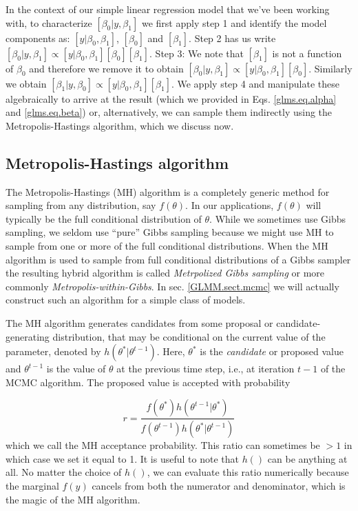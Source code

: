 In the context of our simple linear regression model that we've been 
working with, to characterize $[\beta_0|y,\beta_1]$ we first apply step 1
and identify the model components as: $[y|\beta_0, \beta_1]$, $[\beta_0]$
and $[\beta_1]$. Step 2 has us write $[\beta_0|y,\beta_1] \propto
[y|\beta_0,\beta_1][\beta_0][\beta_1]$.  Step 3: We note that $[\beta_1]$ is not a
function of $\beta_0$ and therefore we remove it to obtain $[\beta_0|y,\beta_1]
\propto [y|\beta_0,\beta_1][\beta_0]$. Similarly we obtain $[\beta_1|y,\beta_0]
\propto [y|\beta_0,\beta_1][\beta_1]$. We apply step 4 and manipulate
these algebraically to arrive at the result (which we provided in
Eqs. \ref{glms.eq.alpha} and \ref{glms.eq.beta}) or, alternatively, we can
sample them indirectly using the Metropolis-Hastings algorithm, which we 
discuss now.


\subsection{Metropolis-Hastings algorithm}

The Metropolis-Hastings (MH) algorithm is a completely generic method for
sampling from any distribution, say $f(\theta)$. In our applications,
$f(\theta)$ will typically be the full conditional distribution of
$\theta$.
While we sometimes use Gibbs sampling, we seldom
use ``pure'' Gibbs sampling because we might use MH to sample from one
or more of the full conditional distributions.
When the MH algorithm is used to sample from  full
conditional distributions of a Gibbs sampler the resulting hybrid algorithm is
called
 {\it Metrpolized Gibbs sampling} or
more commonly {\it Metropolis-within-Gibbs}.
In sec. \ref{GLMM.sect.mcmc} we will
actually construct such an algorithm for a simple class of models.

The MH algorithm generates candidates from some
proposal or candidate-generating distribution, that may be conditional
on the current value of the parameter, denoted by
$h(\theta^{*}|\theta^{t-1})$. Here, $\theta^{*}$ is the {\it candidate}
or proposed
value and $\theta^{t-1}$ is the value of $\theta$ at the previous time step, i.e., at iteration $t-1$ of
the MCMC algorithm.  The proposed value
is accepted with probability

\[
r = \frac{ f(\theta^{*}) h(\theta^{t-1}|\theta^{*})}
    {f(\theta^{t-1}) h(\theta^{*}|\theta^{t-1}) }
\]
which we call the MH acceptance probability.
This ratio can sometimes be $>1$ in which case we set it equal to
1. It is useful to note that $h()$ can be anything at all. No matter
the choice of $h()$, we can evaluate this ratio numerically because
the marginal $f(y)$ cancels from both the numerator and
denominator, which is the magic of the MH algorithm.


